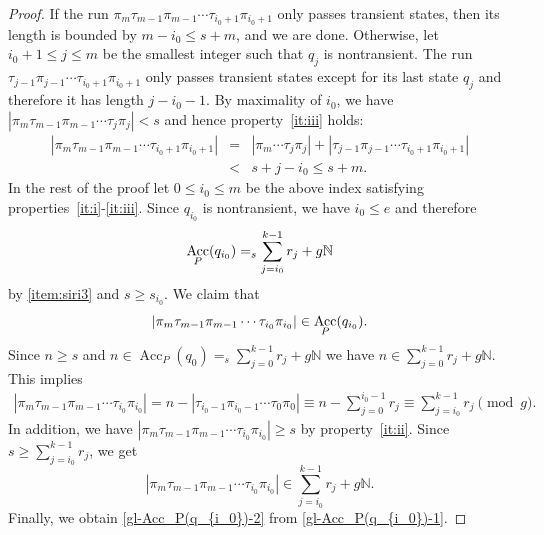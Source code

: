 \documentclass{article}\usepackage[a4paper,margin=20mm]{geometry}
\newcommand{\N}{\mathbb{N}}
\DeclareMathOperator{\Acc}{Acc}
\renewcommand{\geq}{\geqslant}
\renewcommand{\leq}{\leqslant}
\renewcommand{\ge}{\geq}
\renewcommand{\le}{\leq}
\begin{document}
\begin{proof}
If the run $\pi_m \tau_{m-1} \pi_{m-1} \cdots \tau_{{i_0}+1} \pi_{{i_0}+1}$ only passes transient states,
then its length is bounded by $m-{i_0} \le s + m$,  
and we are done.
Otherwise, let ${i_0}+1 \le j \le m$ be the smallest integer such that $q_j$ is nontransient.
The run $\tau_{j-1} \pi_{j-1} \cdots \tau_{{i_0}+1} \pi_{{i_0}+1}$ only passes transient states except for 
its last state $q_j$ 
and therefore it has length $j-{i_0}-1$.
By maximality of ${i_0}$, we have $|\pi_m  \tau_{m-1} \pi_{m-1} \cdots \tau_j \pi_j| < s$
and hence property~\ref{it:iii} holds:
\begin{eqnarray*}
	|\pi_m \tau_{m-1} \pi_{m-1} \cdots \tau_{{i_0}+1} \pi_{{i_0}+1}|  &=& |\pi_m \cdots \tau_j \pi_j| + |\tau_{j-1} \pi_{j-1} \cdots \tau_{{i_0}+1} \pi_{{i_0}+1}|  \\
	&< & s + j - {i_0} \le s + m.
\end{eqnarray*}
In the rest of the proof let $0 \le {i_0} \le m$ be the above index satisfying properties~\ref{it:i}-\ref{it:iii}.
Since $q_{i_0}$ is nontransient, we have $i_0 \le e$
and therefore 
\begin{equation} \label{gl-Acc_P(q_{i_0})-1}
\Acc_P(q_{i_0}) =_s \sum_{j={i_0}}^{k-1} r_j + g \N
\end{equation} 
by \ref{item:siri3} and $s \geq s_{i_0}$.
We claim that 
\begin{equation} \label{gl-Acc_P(q_{i_0})-2}
|\pi_m \tau_{m-1} \pi_{m-1} \cdots \tau_{i_0} \pi_{i_0}| \in \Acc_P(q_{i_0}).
\end{equation}
Since $n \ge s$ and $n \in \Acc_P(q_0) =_{s} \sum_{j=0}^{k-1} r_j + g \N$ 
we have $n \in \sum_{j=0}^{k-1} r_j + g \N$. This implies
\begin{align*}
	|\pi_m \tau_{m-1} \pi_{m-1} \cdots \tau_{i_0} \pi_{i_0}| = n - |\tau_{{i_0}-1} \pi_{{i_0}-1} \cdots \tau_0 \pi_0|  
	 \equiv n - \sum_{j=0}^{{i_0}-1} r_j 
	  \equiv \sum_{j={i_0}}^{k-1} r_j \pmod g.
\end{align*}
In addition, we have $|\pi_m \tau_{m-1} \pi_{m-1} \cdots \tau_{i_0} \pi_{i_0}| \geq s$ 
by property~\ref{it:ii}. Since $s \geq \sum_{j={i_0}}^{k-1} r_j$, we get
\[ 
|\pi_m \tau_{m-1} \pi_{m-1} \cdots \tau_{i_0} \pi_{i_0}|  \in \sum_{j={i_0}}^{k-1} r_j + g \N.
\]
Finally, we obtain \eqref{gl-Acc_P(q_{i_0})-2} from \eqref{gl-Acc_P(q_{i_0})-1}.


\end{proof}
\end{document}
